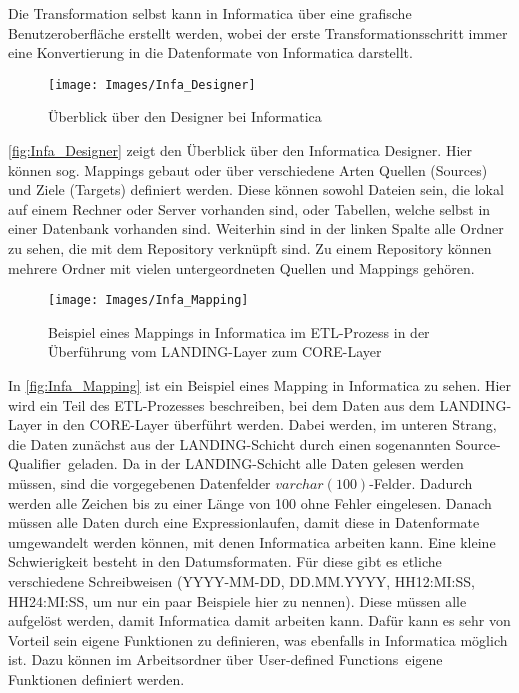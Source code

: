 Die Transformation selbst kann in Informatica über eine grafische Benutzeroberfläche erstellt werden, wobei der erste Transformationsschritt immer eine Konvertierung in die Datenformate von Informatica darstellt.
\begin{figure}[H]
	\begin{center}
		\texttt{[image: Images/Infa\_Designer]}
		\caption{Überblick über den Designer bei Informatica \cite{Intern}}
		\label{fig:Infa_Designer}
	\end{center}
\end{figure}
\autoref{fig:Infa_Designer} zeigt den Überblick über den Informatica Designer. Hier können sog. Mappings gebaut oder über verschiedene Arten Quellen (\glqq Sources\grqq) und Ziele (\glqq Targets\grqq) definiert werden. Diese können sowohl Dateien sein, die lokal auf einem Rechner oder Server vorhanden sind, oder Tabellen, welche selbst in einer Datenbank  vorhanden sind. Weiterhin sind in der linken Spalte alle Ordner zu sehen, die mit dem Repository verknüpft sind. Zu einem Repository können mehrere Ordner mit vielen untergeordneten Quellen und Mappings gehören.
\begin{figure}[H]
	\begin{center}
		\texttt{[image: Images/Infa\_Mapping]}
		\caption{Beispiel eines Mappings in Informatica im ETL-Prozess in der Überführung vom LANDING-Layer zum CORE-Layer \cite{Intern}}
		\label{fig:Infa_Mapping}
	\end{center}
\end{figure}
In \autoref{fig:Infa_Mapping} ist ein Beispiel eines Mapping in Informatica zu sehen. Hier wird ein Teil des ETL-Prozesses beschreiben, bei dem Daten aus dem LANDING-Layer in den CORE-Layer überführt werden. Dabei werden, im unteren Strang, die Daten zunächst aus der LANDING-Schicht durch einen sogenannten \glqq Source-Qualifier\grqq~geladen. Da in der LANDING-Schicht alle Daten gelesen werden müssen, sind die vorgegebenen Datenfelder $varchar(100)$-Felder. Dadurch werden alle Zeichen bis zu einer Länge von 100 ohne Fehler eingelesen. Danach müssen alle Daten durch eine \glqq Expression\glqq laufen, damit diese in Datenformate umgewandelt werden können, mit denen Informatica arbeiten kann. Eine kleine Schwierigkeit besteht in den Datumsformaten. Für diese gibt es etliche verschiedene Schreibweisen (YYYY-MM-DD, DD.MM.YYYY, HH12:MI:SS, HH24:MI:SS, um nur ein paar Beispiele hier zu nennen). Diese müssen alle aufgelöst werden, damit Informatica damit arbeiten kann. Dafür kann es sehr von Vorteil sein eigene Funktionen zu definieren, was ebenfalls in Informatica möglich ist. Dazu können im Arbeitsordner über \glqq User-defined Functions\grqq~eigene Funktionen definiert werden.

